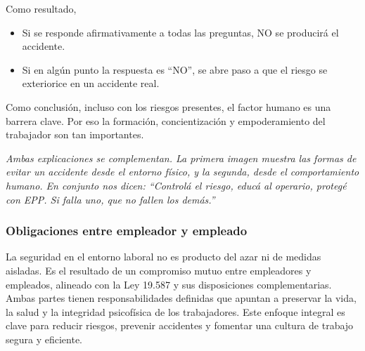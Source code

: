 \documentclass[a4paper,oneside,11pt]{article}
\begin{document}
Como resultado, 
\begin{itemize}
    \item Si se responde afirmativamente a todas las preguntas, NO se producirá el accidente.
    \item Si en algún punto la respuesta es “NO”, se abre paso a que el riesgo se exteriorice en un accidente real.
\end{itemize}

Como conclusión, incluso con los riesgos presentes, el factor humano es una barrera clave. Por eso la formación, concientización y empoderamiento del trabajador son tan importantes.

\textit{Ambas explicaciones se complementan. La primera imagen muestra las formas de evitar un accidente desde el entorno físico, y la segunda, desde el comportamiento humano. En conjunto nos dicen: “Controlá el riesgo, educá al operario, protegé con EPP. Si falla uno, que no fallen los demás.”}

\subsubsection{Obligaciones entre empleador y empleado}

La seguridad en el entorno laboral no es producto del azar ni de medidas aisladas. Es el resultado de un compromiso mutuo entre empleadores y empleados, alineado con la Ley 19.587 y sus disposiciones complementarias. Ambas partes tienen responsabilidades definidas que apuntan a preservar la vida, la salud y la integridad psicofísica de los trabajadores. Este enfoque integral es clave para reducir riesgos, prevenir accidentes y fomentar una cultura de trabajo segura y eficiente.
\end{document}
